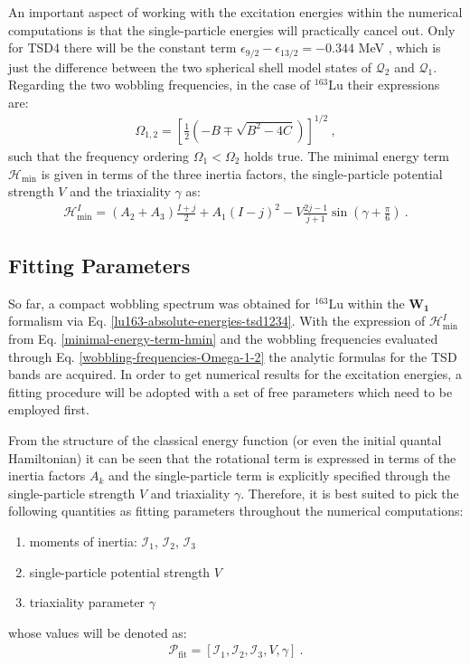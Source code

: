 An important aspect of working with the excitation energies within the numerical computations is that the single-particle energies will practically cancel out. Only for TSD4 there will be the constant term $\epsilon_{9/2}-\epsilon_{13/2}=-0.344$ MeV \cite{raduta2020towards}, which is just the difference between the two spherical shell model states of $\mathcal{Q}_2$ and $\mathcal{Q}_1$. Regarding the two wobbling frequencies, in the case of $^{163}$Lu their expressions are:
\begin{align}
    \Omega_{1,2}=\left[\frac{1}{2}\left(-B\mp\sqrt{B^2-4C}\right)\right]^{1/2}\ ,
    \label{wobbling-frequencies-Omega-1-2}
\end{align}
such that the frequency ordering $\Omega_1<\Omega_2$ holds true. The minimal energy term $\mathcal{H}_\text{min}$ is given in terms of the three inertia factors, the single-particle potential strength $V$ and the triaxiality $\gamma$ as:
\begin{align}
    \mathcal{H}_\text{min}^I=\left(A_2+A_3\right)\frac{I+j}{2}+A_1(I-j)^2-V\frac{2j-1}{j+1}\sin\left(\gamma+\frac{\pi}{6}\right)\ .
    \label{minimal-energy-term-hmin}
\end{align}

\subsection{Fitting Parameters}

So far, a compact wobbling spectrum was obtained for $^{163}$Lu within the $\mathbf{W_1}$ formalism via Eq. \ref{lu163-absolute-energies-tsd1234}. With the expression of $\mathcal{H}_\text{min}^I$ from Eq. \ref{minimal-energy-term-hmin} and the wobbling frequencies evaluated through Eq. \ref{wobbling-frequencies-Omega-1-2} the analytic formulas for the TSD bands are acquired. In order to get numerical results for the excitation energies, a fitting procedure will be adopted with a set of free parameters which need to be employed first.

From the structure of the classical energy function (or even the initial quantal Hamiltonian) it can be seen that the rotational term is expressed in terms of the inertia factors $A_k$ and the single-particle term is explicitly specified through the single-particle strength $V$ and triaxiality $\gamma$. Therefore, it is best suited to pick the following quantities as fitting parameters throughout the numerical computations:
\begin{enumerate}
    \item moments of inertia: $\mathcal{I}_1$, $\mathcal{I}_2$, $\mathcal{I}_3$
    \item single-particle potential strength $V$
    \item triaxiality parameter $\gamma$
\end{enumerate}
whose values will be denoted as:
\begin{align}
    \mathcal{P}_\text{fit}=\left[\mathcal{I}_1,\mathcal{I}_2,\mathcal{I}_3,V,\gamma\right]\ .
    \label{fitting-parameters-p-fit}
\end{align}

